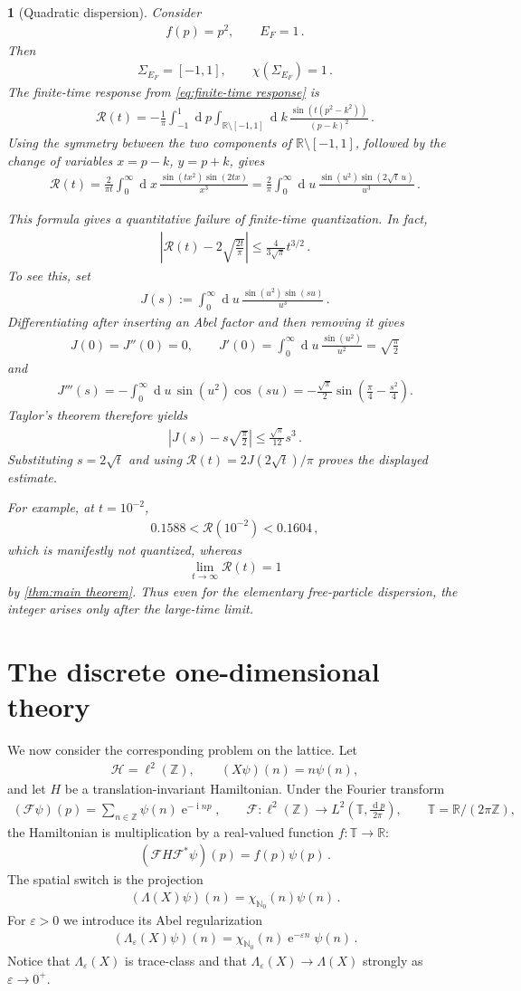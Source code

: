 \documentclass[a4paper,10pt]{article}
\numberwithin{equation}{section}
\theoremstyle{plain}
\theoremstyle{plain}
\theoremstyle{plain}
\theoremstyle{plain}
\theoremstyle{plain}
\theoremstyle{remark}
\theoremstyle{definition}
\theoremstyle{plain}
\newtheorem{example}[thm]{\protect\examplename}
\providecommand{\examplename}{Example}
\newcommand{\ee}{\operatorname{e}}
\newcommand{\ii}{\operatorname{i}}
\newcommand{\ZZ}{\mathbb{Z}}
\newcommand{\TT}{\mathbb{T}}
\newcommand{\NN}{\mathbb{N}}
\newcommand{\RR}{\mathbb{R}}
\newcommand{\calF}{\mathcal{F}}
\newcommand{\calR}{\mathcal{R}}
\newcommand{\calH}{\mathcal{H}}
\newcommand{\dif}{\operatorname{d}\!} %
\newcommand{\ve}{\varepsilon}
\newcommand{\eq}[1]{\begin{align*}#1\end{align*}}
\begin{document}
\begin{example}[Quadratic dispersion]\label{ex:finite-time quadratic}
Consider
\eq{f(p)=p^2,\qquad E_F=1\,.}
Then
\eq{\Sigma_{E_F}=[-1,1],\qquad \chi(\Sigma_{E_F})=1\,.}
The finite-time response from \cref{eq:finite-time response} is
\eq{\calR(t)
=
-\frac{1}{\pi}
\int_{-1}^{1}\dif{p}
\int_{\RR\setminus[-1,1]}\dif{k}\,
\frac{\sin\left(t(p^2-k^2)\right)}{(p-k)^2}\,.}
Using the symmetry between the two components of
$\RR\setminus[-1,1]$, followed by the change of variables
$x=p-k$, $y=p+k$, gives
\eq{\calR(t)
=
\frac{2}{\pi t}
\int_0^\infty\dif{x}\,
\frac{\sin(tx^2)\sin(2tx)}{x^3}
=
\frac{2}{\pi}
\int_0^\infty\dif{u}\,
\frac{\sin(u^2)\sin(2\sqrt{t}\,u)}{u^3}\,.}

This formula gives a quantitative failure of finite-time quantization. In
fact,
\eq{\left|
\calR(t)-2\sqrt{\frac{2t}{\pi}}
\right|
\leq
\frac{4}{3\sqrt{\pi}}t^{3/2}\,.}
To see this, set
\eq{J(s):=\int_0^\infty\dif{u}\,
\frac{\sin(u^2)\sin(su)}{u^3}\,.}
Differentiating after inserting an Abel factor and then removing it gives
\eq{J(0)=J''(0)=0,\qquad
J'(0)=\int_0^\infty\dif{u}\,\frac{\sin(u^2)}{u^2}
=\sqrt{\frac{\pi}{2}}}
and
\eq{J'''(s)
=
-\int_0^\infty\dif{u}\,\sin(u^2)\cos(su)
=
-\frac{\sqrt{\pi}}{2}
\sin\left(\frac{\pi}{4}-\frac{s^2}{4}\right).}
Taylor's theorem therefore yields
\eq{\left|J(s)-s\sqrt{\frac{\pi}{2}}\right|
\leq\frac{\sqrt{\pi}}{12}s^3\,.}
Substituting $s=2\sqrt{t}$ and using
$\calR(t)=2J(2\sqrt{t})/\pi$ proves the displayed estimate.

For example, at $t=10^{-2}$,
\eq{0.1588<\calR(10^{-2})<0.1604\,,}
which is manifestly not quantized, whereas
\eq{\lim_{t\to\infty}\calR(t)=1}
by \cref{thm:main theorem}. Thus even for the elementary free-particle
dispersion, the integer arises only after the large-time limit.
\end{example}


\section{The discrete one-dimensional theory}\label{sec:discrete}

We now consider the corresponding problem on the lattice. Let
\eq{\calH=\ell^2(\ZZ),\qquad (X\psi)(n)=n\psi(n),}
and let $H$ be a translation-invariant Hamiltonian. Under the Fourier
transform
\eq{(\calF\psi)(p)=\sum_{n\in\ZZ}\psi(n)\ee^{-\ii np},
\qquad
\calF:\ell^2(\ZZ)\longrightarrow
L^2\left(\TT,\frac{\dif{p}}{2\pi}\right),
\qquad
\TT=\RR/(2\pi\ZZ),}
the Hamiltonian is multiplication by a real-valued function
$f:\TT\to\RR$:
\eq{(\calF H\calF^*\psi)(p)=f(p)\psi(p)\,.}
The spatial switch is the projection
\eq{(\Lambda(X)\psi)(n)=\chi_{\NN_0}(n)\psi(n)\,.}
For $\ve>0$ we introduce its Abel regularization
\eq{(\Lambda_\ve(X)\psi)(n)
=\chi_{\NN_0}(n)\ee^{-\ve n}\psi(n)\,.}
Notice that $\Lambda_\ve(X)$ is trace-class and that
$\Lambda_\ve(X)\to\Lambda(X)$ strongly as $\ve\to0^+$.
\end{document}
